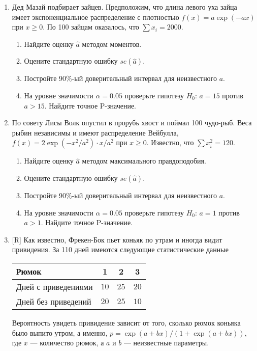 \begin{enumerate}
\item Дед Мазай подбирает зайцев. Предположим, что длина левого уха зайца имеет
экспоненциальное распределение с плотностью $f(x)=a\exp(-ax)$ при $x\geq 0$. По
100 зайцам оказалось, что $\sum x_i=2000$.
\begin{enumerate}
\item Найдите оценку $\hat{a}$ методом моментов.
\item Оцените стандартную ошибку $se(\hat{a})$.
\item Постройте 90\%-ый доверительный интервал для неизвестного $a$.
\item На уровне значимости $\alpha=0.05$ проверьте гипотезу $H_0$: $a=15$ против
$a>15$. Найдите точное P-значение.
\end{enumerate}

\item По совету Лисы Волк опустил в прорубь хвост и поймал 100 чудо-рыб. Веса
рыбин независимы и имеют распределение Вейбулла, $f(x)=2\exp(-x^2/a^2)\cdot x/a^2$
при $x\geq 0$. Известно, что $\sum x_i^2=120$.
\begin{enumerate}
\item Найдите оценку $\hat{a}$ методом максимального правдоподобия.
\item Оцените стандартную ошибку $se(\hat{a})$.
\item Постройте 90\%-ый доверительный интервал для неизвестного $a$.
\item На уровне значимости $\alpha=0.05$ проверьте гипотезу $H_0$: $a=1$ против
$a>1$. Найдите точное P-значение.
\end{enumerate}

\item $[$R] Как известно, Фрекен-Бок пьет коньяк по утрам и иногда видит привидения.
За 110 дней имеются следующие статистические данные

\begin{tabular}{@{}lccc@{}}
\toprule
Рюмок               & 1    & 2    & 3    \\ \midrule
Дней с приведениями & $10$ & $25$ & $20$ \\
Дней без приведений & $20$ & $25$ & $10$ \\ \bottomrule
\end{tabular}

Вероятность увидеть привидение зависит от того, сколько рюмок коньяка было выпито
утром, а именно, $p=\exp(a+bx)/(1+ \exp(a+bx))$, где $x$ — количество рюмок, а $a$
и $b$ — неизвестные параметры.


\end{enumerate}
